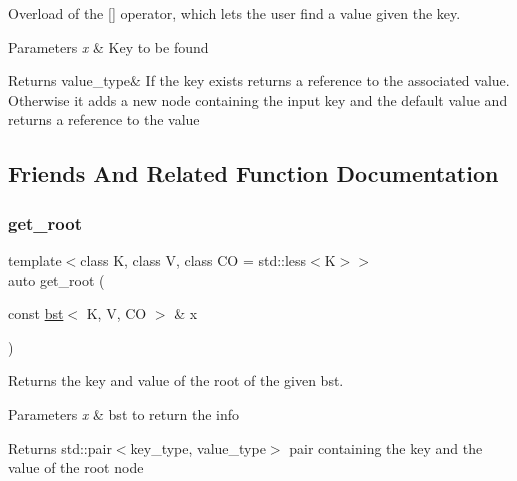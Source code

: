 Overload of the \mbox{[}\mbox{]} operator, which lets the user find a value given the key. 


\begin{DoxyParams}{Parameters}
{\em x} & Key to be found \\
\hline
\end{DoxyParams}
\begin{DoxyReturn}{Returns}
value\+\_\+type\& If the key exists returns a reference to the associated value. Otherwise it adds a new node containing the input key and the default value and returns a reference to the value 
\end{DoxyReturn}


\subsection{Friends And Related Function Documentation}
\mbox{\label{classbst_aecb3dc60f765eb28a88e75c966a76336}} 
\subsubsection{\texorpdfstring{get\+\_\+root}{get\_root}}
{\footnotesize\ttfamily template$<$class K, class V, class CO = std\+::less$<$\+K$>$$>$ \\
auto get\+\_\+root (\begin{DoxyParamCaption}\item[{const \hyperlink{classbst}{bst}$<$ K, V, CO $>$ \&}]{x }\end{DoxyParamCaption})\hspace{0.3cm}{\ttfamily [friend]}}



Returns the key and value of the root of the given bst. 


\begin{DoxyParams}{Parameters}
{\em x} & bst to return the info \\
\hline
\end{DoxyParams}
\begin{DoxyReturn}{Returns}
std\+::pair$<$key\+\_\+type, value\+\_\+type$>$ pair containing the key and the value of the root node 
\end{DoxyReturn}
\mbox{\label{classbst_ae4b7d69364fca0855f74abdcad674ebf}} 
